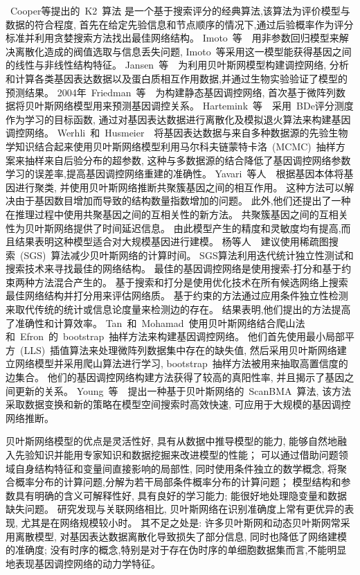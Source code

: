 ~Cooper等提出的~K2~算法\cite{cooper1992bayesian}
是一个基于搜索评分的经典算法,该算法为评价模型与数据的符合程度,
首先在给定先验信息和节点顺序的情况下,通过后验概率作为评分标准并利用贪婪搜索方法找出最佳网络结构。
Imoto~等~\cite{kim2003inferring}~用非参数回归模型来解决离散化造成的阀值选取与信息丢失问题,
Imoto~等采用这一模型能获得基因之间的线性与非线性结构特征。
Jansen~等~\cite{jansen2003bayesian}~为利用贝叶斯网模型构建调控网络,
分析和计算各类基因表达数据以及蛋白质相互作用数据,并通过生物实验验证了模型的预测结果。
2004年~Friedman~等~\cite{friedman2004inferring}~为构建静态基因调控网络,
首次基于微阵列数据将贝叶斯网络模型用来预测基因调控关系。
Hartemink~等~\cite{hartemink2005reverse}~采用~BDe评分测度作为学习的目标函数,
通过对基因表达数据进行离散化及模拟退火算法来构建基因调控网络。
Werhli~和~Husmeier~\cite{werhli2007reconstructing}~将基因表达数据与来自多种数据源的先验生物学知识结合起来使用贝叶斯网络模型利用马尔科夫链蒙特卡洛~(MCMC)~抽样方案来抽样来自后验分布的超参数,
这种与多数据源的结合降低了基因调控网络参数学习的误差率,提高基因调控网络重建的准确性。
Yavari~等人~\cite{yavari2008gene}~根据基因本体将基因进行聚类,
并使用贝叶斯网络推断共聚簇基因之间的相互作用。
这种方法可以解决由于基因数目增加而导致的结构数量指数增加的问题。 
此外,他们还提出了一种在推理过程中使用共聚基因之间的互相关性的新方法。
共聚簇基因之间的互相关性为贝叶斯网络提供了时间延迟信息。 
由此模型产生的精度和灵敏度均有提高,而且结果表明这种模型适合对大规模基因进行建模。
杨等人~\cite{yang2011bayesian}~建议使用稀疏图搜索~(SGS)~算法减少贝叶斯网络的计算时间。
SGS算法利用迭代统计独立性测试和搜索技术来寻找最佳的网络结构。
最佳的基因调控网络是使用搜索-打分和基于约束两种方法混合产生的。
基于搜索和打分是使用优化技术在所有候选网络上搜索最佳网络结构并打分用来评估网络质。
基于约束的方法通过应用条件独立性检测来取代传统的统计或信息论度量来检测边的存在。
结果表明,他们提出的方法提高了准确性和计算效率。
Tan~和~Mohamad~\cite{kunga2012using}使用贝叶斯网络结合爬山法和~Efron~的~bootstrap~抽样方法来构建基因调控网络。
他们首先使用最小局部平方~(LLS)~插值算法来处理微阵列数据集中存在的缺失值, 
然后采用贝叶斯网络建立网络模型并采用爬山算法进行学习, 
bootstrap~抽样方法被用来抽取高置信度的边集合。
他们的基因调控网络构建方法获得了较高的真阳性率, 并且揭示了基因之间更新的关系。 
Young~等~\cite{young2014fast}~提出一种基于贝叶斯网络的~ScanBMA~算法,
该方法采取数据变换和新的策略在模型空间搜索时高效快速,
可应用于大规模的基因调控网络推断。

贝叶斯网络模型的优点是灵活性好, 具有从数据中推导模型的能力, 能够自然地融入先验知识并能用专家知识和数据挖掘来改进模型的性能；
可以通过借助问题领域自身结构特征和变量间直接影响的局部性, 同时使用条件独立的数学概念, 将聚合概率分布的计算问题,分解为若干局部条件概率分布的计算问题；
模型结构和参数具有明确的含义可解释性好, 具有良好的学习能力; 能很好地处理隐变量和数据缺失问题。
研究发现与关联网络相比, 贝叶斯网络在识别准确度上常有更优异的表现, 尤其是在网络规模较小时。
其不足之处是: 许多贝叶斯网和动态贝叶斯网常采用离散模型, 对基因表达数据离散化导致损失了部分信息,
同时也降低了网络建模的准确度;
没有时序的概念,特别是对于存在伪时序的单细胞数据集而言,不能明显地表现基因调控网络的动力学特征。

